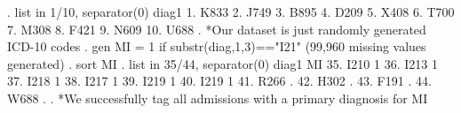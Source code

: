 . list in 1/10, separator(0)
{\smallskip}
     {\TLC}
     {\VBAR} diag1 {\VBAR}
     {\LFTT}
  1. {\VBAR}  K833 {\VBAR}
  2. {\VBAR}  J749 {\VBAR}
  3. {\VBAR}  B895 {\VBAR}
  4. {\VBAR}  D209 {\VBAR}
  5. {\VBAR}  X408 {\VBAR}
  6. {\VBAR}  T700 {\VBAR}
  7. {\VBAR}  M308 {\VBAR}
  8. {\VBAR}  F421 {\VBAR}
  9. {\VBAR}  N609 {\VBAR}
 10. {\VBAR}  U688 {\VBAR}
     {\BLC}
{\smallskip}
. *Our dataset is just randomly generated ICD-10 codes
. gen MI = 1 if substr(diag,1,3)=="I21"
(99,960 missing values generated)
{\smallskip}
. sort MI
{\smallskip}
. list in 35/44, separator(0)
{\smallskip}
     {\TLC}
     {\VBAR} diag1   MI {\VBAR}
     {\LFTT}
 35. {\VBAR}  I210    1 {\VBAR}
 36. {\VBAR}  I213    1 {\VBAR}
 37. {\VBAR}  I218    1 {\VBAR}
 38. {\VBAR}  I217    1 {\VBAR}
 39. {\VBAR}  I219    1 {\VBAR}
 40. {\VBAR}  I219    1 {\VBAR}
 41. {\VBAR}  R266    . {\VBAR}
 42. {\VBAR}  H302    . {\VBAR}
 43. {\VBAR}  F191    . {\VBAR}
 44. {\VBAR}  W688    . {\VBAR}
     {\BLC}
{\smallskip}
. *We successfully tag all admissions with a primary diagnosis for MI
